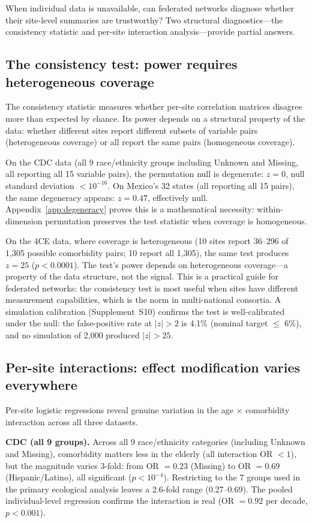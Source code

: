 \documentclass[11pt]{article}
\begin{document}
When individual data is unavailable, can federated networks diagnose
whether their site-level summaries are trustworthy?  Two structural
diagnostics---the consistency statistic and per-site interaction
analysis---provide partial answers.

\subsection{The consistency test: power requires heterogeneous coverage}

The consistency statistic measures whether per-site correlation matrices
disagree more than expected by chance.  Its power depends on a structural
property of the data: whether different sites report different subsets of
variable pairs (heterogeneous coverage) or all report the same pairs
(homogeneous coverage).

On the CDC data (all 9 race/ethnicity groups including Unknown and
Missing, all reporting all 15 variable pairs), the
permutation null is degenerate: $z = 0$, null standard deviation
$< 10^{-16}$.  On Mexico's 32 states (all reporting all 15 pairs), the
same degeneracy appears: $z = 0.47$, effectively null.
Appendix~\ref{app:degeneracy} proves this is a mathematical necessity:
within-dimension permutation preserves the test statistic when coverage is
homogeneous.

On the 4CE data, where coverage is heterogeneous (10 sites report
36--296 of 1,305 possible comorbidity pairs; 10 report all 1,305), the
same test produces $z = 25$ ($p < 0.0001$).  The test's power depends on
heterogeneous coverage---a property of the data structure, not the signal.
This is a practical guide for federated networks: the consistency test is
most useful when sites have different measurement capabilities,
which is the norm in multi-national consortia.  A simulation calibration
(Supplement~S10) confirms the test is well-calibrated under the null:
the false-positive rate at $|z| > 2$ is 4.1\% (nominal target
$\leq$ 6\%), and no simulation of 2{,}000 produced $|z| > 25$.


\subsection{Per-site interactions: effect modification varies everywhere}

Per-site logistic regressions reveal genuine variation in the
age $\times$ comorbidity interaction across all three datasets.

\textbf{CDC (all 9 groups).}  Across all 9 race/ethnicity categories
(including Unknown and Missing), comorbidity matters
less in the elderly (all interaction OR $< 1$), but the magnitude varies
3-fold: from OR $= 0.23$ (Missing) to OR $= 0.69$ (Hispanic/Latino), all
significant ($p < 10^{-4}$).  Restricting to the 7 groups used in the
primary ecological analysis leaves a 2.6-fold range (0.27--0.69).  The pooled individual-level regression
confirms the interaction is real (OR $= 0.92$ per decade,
$p < 0.001$).
\end{document}

